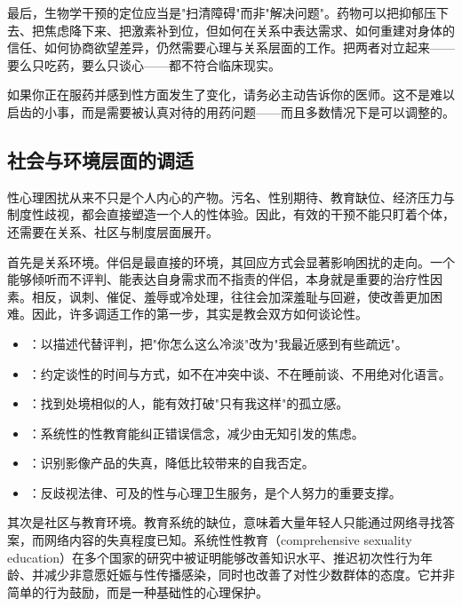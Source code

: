 最后，生物学干预的定位应当是"扫清障碍"而非"解决问题"。药物可以把抑郁压下去、把焦虑降下来、把激素补到位，但如何在关系中表达需求、如何重建对身体的信任、如何协商欲望差异，仍然需要心理与关系层面的工作。把两者对立起来——要么只吃药，要么只谈心——都不符合临床现实。

\begin{tcolorbox}[colback=pink!5!white,colframe=red!50!black,title=贴心小叮咛]
如果你正在服药并感到性方面发生了变化，请务必主动告诉你的医师。这不是难以启齿的小事，而是需要被认真对待的用药问题——而且多数情况下是可以调整的。
\end{tcolorbox}
\subsection{社会与环境层面的调适}

性心理困扰从来不只是个人内心的产物。污名、性别期待、教育缺位、经济压力与制度性歧视，都会直接塑造一个人的性体验。因此，有效的干预不能只盯着个体，还需要在关系、社区与制度层面展开。

首先是关系环境。伴侣是最直接的环境，其回应方式会显著影响困扰的走向。一个能够倾听而不评判、能表达自身需求而不指责的伴侣，本身就是重要的治疗性因素。相反，讽刺、催促、羞辱或冷处理，往往会加深羞耻与回避，使改善更加困难。因此，许多调适工作的第一步，其实是教会双方如何谈论性。

\begin{itemize}
  \item {}：以描述代替评判，把"你怎么这么冷淡"改为"我最近感到有些疏远"。
  \item {}：约定谈性的时间与方式，如不在冲突中谈、不在睡前谈、不用绝对化语言。
  \item {}：找到处境相似的人，能有效打破"只有我这样"的孤立感。
  \item {}：系统性的性教育能纠正错误信念，减少由无知引发的焦虑。
  \item {}：识别影像产品的失真，降低比较带来的自我否定。
  \item {}：反歧视法律、可及的性与心理卫生服务，是个人努力的重要支撑。
\end{itemize}

其次是社区与教育环境。教育系统的缺位，意味着大量年轻人只能通过网络寻找答案，而网络内容的失真程度已知。系统性性教育（comprehensive sexuality education）在多个国家的研究中被证明能够改善知识水平、推迟初次性行为年龄、并减少非意愿妊娠与性传播感染，同时也改善了对性少数群体的态度。它并非简单的行为鼓励，而是一种基础性的心理保护。

